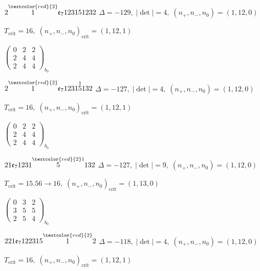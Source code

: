 \documentclass[10pt]{article}
\begin{document}
\smallskip

$2\overset{\textcolor{red}{2}}{1}\mathfrak{e}_7123151232$ \quad $\Delta=-129,\; |\det|=4,\; (n_+,n_-,n_0)=(1,12,0)$

\hspace{1em}$T_{\text{crit}}=16,\; (n_+,n_-,n_0)_{\text{crit}}=(1,12,1)$

\hspace{2em}$\left(\begin{smallmatrix}0 & 2 & 2 \\ 2 & 4 & 4 \\ 2 & 4 & 4\end{smallmatrix}\right)_{\!b_0}$

\smallskip

$2\overset{\textcolor{red}{2}}{1}\mathfrak{e}_71231\overset{1}{5}132$ \quad $\Delta=-127,\; |\det|=4,\; (n_+,n_-,n_0)=(1,12,0)$

\hspace{1em}$T_{\text{crit}}=16,\; (n_+,n_-,n_0)_{\text{crit}}=(1,12,1)$

\hspace{2em}$\left(\begin{smallmatrix}0 & 2 & 2 \\ 2 & 4 & 4 \\ 2 & 4 & 4\end{smallmatrix}\right)_{\!b_0}$

$21\mathfrak{e}_71231\overset{\textcolor{red}{2}1}{5}132$ \quad $\Delta=-127,\; |\det|=9,\; (n_+,n_-,n_0)=(1,12,0)$

\hspace{1em}$T_{\text{crit}}=15.56 \to 16,\; (n_+,n_-,n_0)_{\text{crit}}=(1,13,0)$

\hspace{2em}$\left(\begin{smallmatrix}0 & 3 & 2 \\ 3 & 5 & 5 \\ 2 & 5 & 4\end{smallmatrix}\right)_{\!b_0}$

\smallskip

$221\mathfrak{e}_7122315\overset{\textcolor{red}{2}}{1}2$ \quad $\Delta=-118,\; |\det|=4,\; (n_+,n_-,n_0)=(1,12,0)$

\hspace{1em}$T_{\text{crit}}=16,\; (n_+,n_-,n_0)_{\text{crit}}=(1,12,1)$
\end{document}

